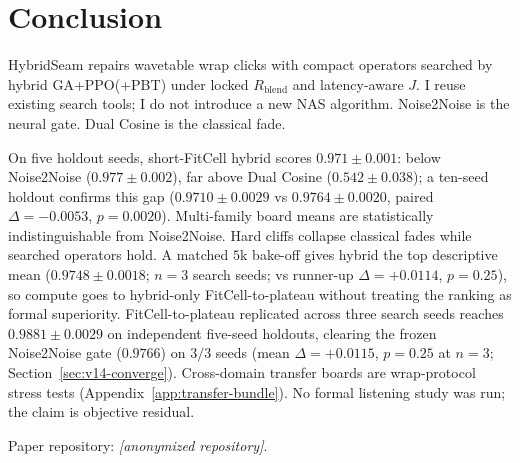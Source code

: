 \section{Conclusion}
\label{sec:conclusion}

HybridSeam repairs wavetable wrap clicks with compact operators searched by hybrid GA+PPO(+PBT) under locked $R_{\mathrm{blend}}$ and latency-aware $J$.
I reuse existing search tools; I do not introduce a new NAS algorithm.
Noise2Noise is the neural gate. Dual Cosine is the classical fade.

On five holdout seeds, short-FitCell hybrid scores $0.971{\pm}0.001$: below Noise2Noise ($0.977{\pm}0.002$), far above Dual Cosine ($0.542{\pm}0.038$); a ten-seed holdout confirms this gap ($0.9710{\pm}0.0029$ vs $0.9764{\pm}0.0020$, paired $\Delta{=}{-}0.0053$, $p{=}0.0020$).
Multi-family board means are statistically indistinguishable from Noise2Noise.
Hard cliffs collapse classical fades while searched operators hold.
A matched $5$k bake-off gives hybrid the top descriptive mean ($0.9748{\pm}0.0018$; $n{=}3$ search seeds; vs runner-up $\Delta{=}{+}0.0114$, $p{=}0.25$), so compute goes to hybrid-only FitCell-to-plateau without treating the ranking as formal superiority.
FitCell-to-plateau replicated across three search seeds reaches $0.9881{\pm}0.0029$ on independent five-seed holdouts, clearing the frozen Noise2Noise gate ($0.9766$) on $3/3$ seeds (mean $\Delta{=}{+}0.0115$, $p{=}0.25$ at $n{=}3$; Section~\ref{sec:v14-converge}).
Cross-domain transfer boards are wrap-protocol stress tests (Appendix~\ref{app:transfer-bundle}).
No formal listening study was run; the claim is objective residual.

Paper repository: \textit{[anonymized repository]}.
